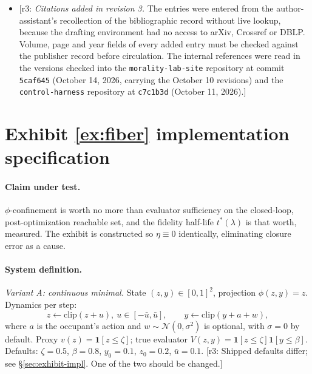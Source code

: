 \documentclass[11pt]{article}
\theoremstyle{definition}
\theoremstyle{remark}
\newcommand{\revnote}[1]{\textcolor{red!60!black}{[r3: #1]}}
\begin{document}
\begin{itemize}
\item \revnote{\emph{Citations added in revision 3.} The entries \cite{wong1999,nair2004,colonius2013,kawan2011,nair2007,hespanha2007,martins2007,martins2008,freudenberg1985,donkers2014,tabuada2009,girard2007,ames2019,mezic2005,brunton2022,lin2021,subag2017,fyodorov2007,dauphin2014,choromanska2015,sagun2018,ghorbani2019,papyan2020,greenblatt2023,manheim2018,skalse2022,zhuang2020,christiano2018,irving2018,bowman2022,burns2023,turner2023,li2023iti,zou2023,kaelbling1998,demoura2021,mathlib2020,sharkey2025,cunningham2023,bricken2023,yao1977,goldreich1998} were entered from the author-assistant's recollection of the bibliographic record without live lookup, because the drafting environment had no access to arXiv, Crossref or DBLP. Volume, page and year fields of every added entry must be checked against the publisher record before circulation. The internal references \cite{dugan2025frc,dugan2025collapse,dugan2026trmldt,dugan2026harness} were read in the versions checked into the \texttt{morality-lab-site} repository at commit \texttt{5caf645} (October 14, 2026, carrying the October 10 revisions) and the \texttt{control-harness} repository at \texttt{c7c1b3d} (October 11, 2026).}
\end{itemize}

\appendix

\section{Exhibit \ref{ex:fiber} implementation specification}\label{app:spec}

\paragraph{Claim under test.} $\phi$-confinement is worth no more than evaluator sufficiency on the closed-loop, post-optimization reachable set, and the fidelity half-life $t^*(\lambda)$ is that worth, measured. The exhibit is constructed so $\eta\equiv0$ identically, eliminating closure error as a cause.

\paragraph{System definition.}
\emph{Variant A: continuous minimal.} State $(z,y)\in[0,1]^2$, projection $\phi(z,y)=z$. Dynamics per step:
\begin{equation}
z\leftarrow\mathrm{clip}(z+u),\ u\in[-\bar u,\bar u],\qquad y\leftarrow\mathrm{clip}(y+a+w), \label{eq:varA}
\end{equation}
where $a$ is the occupant's action and $w\sim\mathcal N(0,\sigma^2)$ is optional, with $\sigma=0$ by default. Proxy $v(z)=\mathbf 1[z\le\zeta]$; true evaluator $V(z,y)=\mathbf 1[z\le\zeta]\mathbf 1[y\le\beta]$. Defaults: $\zeta=0.5$, $\beta=0.8$, $y_0=0.1$, $z_0=0.2$, $\bar u=0.1$. \revnote{Shipped defaults differ; see \S\ref{sec:exhibit-impl}. One of the two should be changed.}
\end{document}
